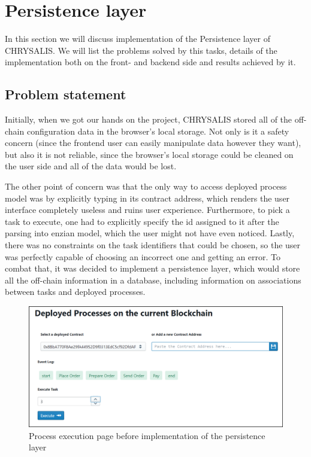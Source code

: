 %
\section{Persistence layer}
\label{sec:impr:persistence}

In this section we will discuss implementation of the Persistence layer of CHRYSALIS. We will list the problems solved by this tasks, details of the implementation both on the front- and backend side and results achieved by it. 

\subsection{Problem statement}
\label{sec:impr:persistence:problem}

Initially, when we got our hands on the project, CHRYSALIS stored all of the off-chain configuration data in the browser's local storage. Not only is it a safety concern (since the frontend user can easily manipulate data however they want), but also it is not reliable, since the browser's local storage could be cleaned on the user side and all of the data would be lost. 

The other point of concern was that the only way to access deployed process model was by explicitly typing in its contract address, which renders the user interface completely useless and ruins user experience. Furthermore, to pick a task to execute, one had to explicitly specify the id assigned to it after the parsing into enzian model, which the user might not have even noticed. Lastly, there was no constraints on the task identifiers that could be chosen, so the user was perfectly capable of choosing an incorrect one and getting an error. To combat that, it was decided to implement a persistence layer, which would store all the off-chain information in a database, including information on associations between tasks and deployed processes. 

\begin{figure}[htb]
	\includegraphics[width=\textwidth]{gfx/persistence_before}
	\caption{Process execution page before implementation of the persistence layer}
	\label{fig:impr:persistence:before}
\end{figure}

